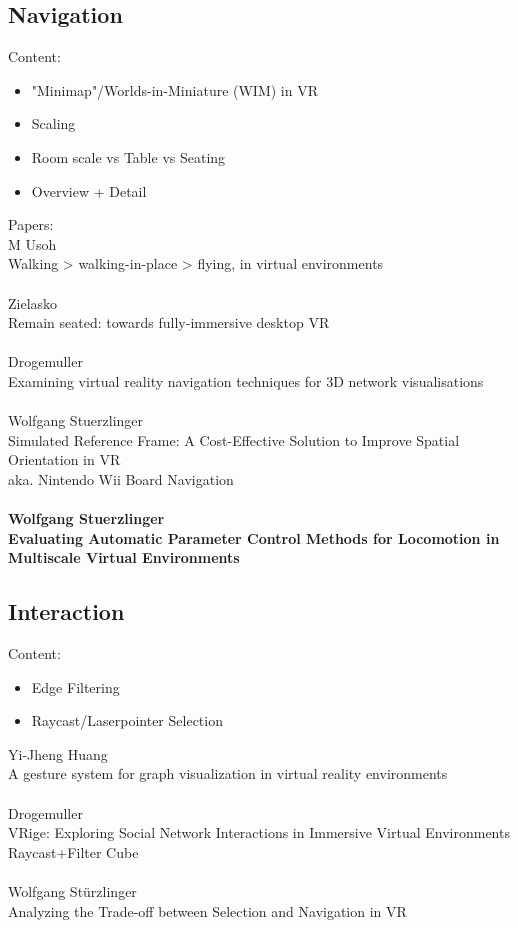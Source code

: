 \subsection{Navigation}
Content:
\begin{itemize}
    \item "Minimap"/Worlds-in-Miniature (WIM) in VR
    \item Scaling
    \item Room scale vs Table vs Seating
    \item Overview + Detail 
\end{itemize}

Papers: \\

M Usoh\\
Walking > walking-in-place > flying, in virtual environments\\
\\
Zielasko\\
Remain seated: towards fully-immersive desktop VR\\
\\
Drogemuller\\
Examining virtual reality navigation techniques for 3D network visualisations\\
\\
Wolfgang Stuerzlinger\\
Simulated Reference Frame: A Cost-Effective Solution to Improve Spatial Orientation in VR\\
aka. Nintendo Wii Board Navigation\\
\\

\textbf{Wolfgang Stuerzlinger\\
Evaluating Automatic Parameter Control Methods for
Locomotion in Multiscale Virtual Environments\\}


\subsection{Interaction}
Content: 
\begin{itemize}
    \item Edge Filtering
    \item Raycast/Laserpointer Selection
\end{itemize}

Yi-Jheng Huang\\
A gesture system for graph visualization in virtual reality environments\\
\\
Drogemuller\\
VRige: Exploring Social Network Interactions in Immersive Virtual Environments\\
Raycast+Filter Cube\\
\\
Wolfgang Stürzlinger\\
Analyzing the Trade-off between Selection and Navigation in VR\\



